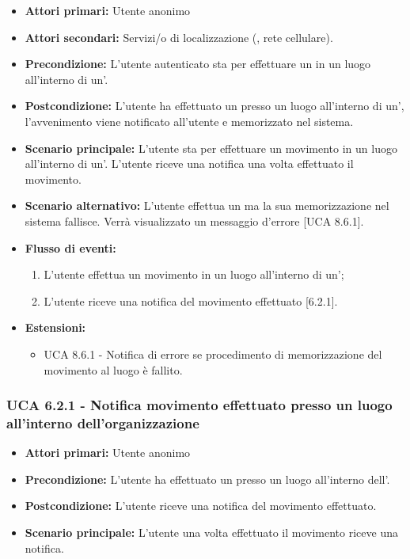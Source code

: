 \begin{itemize}
	\item \textbf{Attori primari:} Utente anonimo
	\item \textbf{Attori secondari:} Servizi/o di localizzazione (, rete cellulare).
	\item \textbf{Precondizione:} L'utente autenticato sta per effettuare un  in un luogo all'interno di un'.
	\item \textbf{Postcondizione:} L'utente ha effettuato un  presso un luogo all'interno di un', l'avvenimento viene notificato all'utente e memorizzato nel sistema. 
	\item \textbf{Scenario principale:} L'utente sta per effettuare un movimento in un luogo all'interno di un'. L'utente riceve una notifica una volta effettuato il movimento.
	\item \textbf{Scenario alternativo:} L'utente effettua un  ma la sua memorizzazione nel sistema fallisce. Verrà visualizzato un messaggio d'errore [UCA 8.6.1].
	\item \textbf{Flusso di eventi:}
	\begin{enumerate}
		\item L'utente effettua un movimento in un luogo all'interno di un';
		\item L'utente riceve una notifica del movimento effettuato [6.2.1].
	\end{enumerate}
	\item \textbf{Estensioni:}
	\begin{itemize}
		\item UCA 8.6.1 - Notifica di errore se procedimento di memorizzazione del movimento al luogo è fallito.
	\end{itemize}
\end{itemize}

\subsubsection{UCA 6.2.1 - Notifica movimento effettuato presso un luogo all'interno dell'organizzazione}
\begin{itemize}
	\item \textbf{Attori primari:} Utente anonimo
	\item \textbf{Precondizione:} L'utente ha effettuato un  presso un luogo all'interno dell'.
	\item \textbf{Postcondizione:} L'utente riceve una notifica del movimento effettuato.
	\item \textbf{Scenario principale:} L'utente una volta effettuato il movimento riceve una notifica.
\end{itemize}














